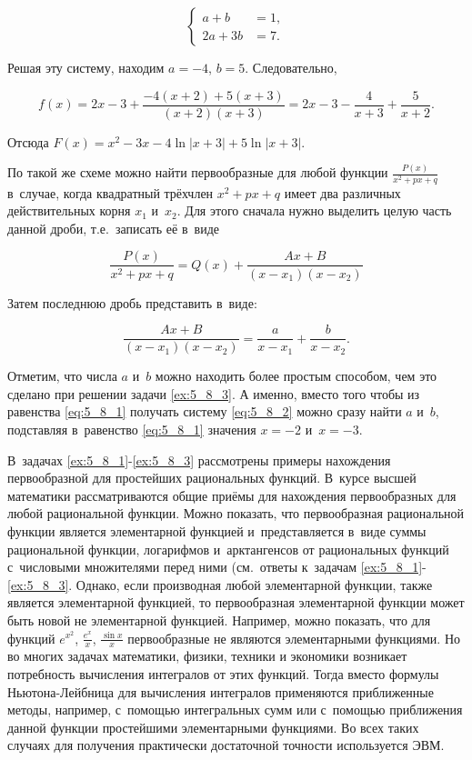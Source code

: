 \begin{equation}\label{eq:5_8_2}
\begin{cases}
a + b &= 1, \\
2a + 3b &= 7.
\end{cases}
\end{equation}

Решая эту систему, находим $a = -4$, $b = 5$.
Следовательно, 

\begin{equation*}
\displaystyle f(x) = 
2x - 3 + \frac{-4(x+2) + 5(x+3)}{(x+2)(x+3)} = 
2x - 3 - \frac{4}{x+3} + \frac{5}{x+2}.
\end{equation*}

Отсюда $F(x) = x^{2} - 3x - 4\ln |x+3| + 5\ln |x + 3|$.

По такой же схеме можно найти первообразные для любой функции 
$\displaystyle \frac{P(x)}{x^{2} + px + q}$ 
в~случае, когда квадратный трёхчлен $x^{2} + px + q$ имеет два различных
действительных корня $x_{1}$ и~$x_{2}$.
Для этого сначала нужно выделить целую часть данной дроби,
т.е.\ записать её в~виде

\begin{equation*}
\displaystyle \frac{P(x)}{x^{2} + px + q} = Q(x) + \frac{Ax + B}{(x-x_{1})(x-x_{2})}
\end{equation*}

\noindent
Затем последнюю дробь представить в~виде:

\begin{equation*}
\displaystyle \frac{Ax + B}{(x-x_{1})(x-x_{2})} = \frac{a}{x - x_{1}} + \frac{b}{x - x_{2}}.
\end{equation*}

Отметим, что числа $a$ и~$b$ можно находить более простым способом,
чем это сделано при решении задачи \ref{ex:5_8_3}. 
А именно, вместо того чтобы из равенства \eqref{eq:5_8_1} получать систему \eqref{eq:5_8_2}
можно сразу найти $a$ и~$b$, подставляя в~равенство \eqref{eq:5_8_1} значения
$x = -2$ и~$x = -3$.

В~задачах \ref{ex:5_8_1}-\ref{ex:5_8_3} рассмотрены примеры нахождения первообразной
для простейших рациональных функций. В~курсе высшей математики рассматриваются
общие приёмы для нахождения первообразных для любой рациональной функции.
Можно показать, что первообразная рациональной функции является элементарной функцией
и~представляется в~виде суммы рациональной функции, логарифмов и~арктангенсов
от рациональных функций с~числовыми множителями перед ними
(см.\ ответы к~задачам \ref{ex:5_8_1}-\ref{ex:5_8_3}.
Однако, если производная любой элементарной функции, также является элементарной функцией,
то первообразная элементарной функции может быть новой не элементарной функцией.
Например, можно показать, что для функций
$e^{x^{2}}$, $\displaystyle \frac{e^{x}}{x}$, $\displaystyle \frac{\sin x}{x}$
первообразные не являются элементарными функциями.
Но во многих задачах математики, физики, техники и экономики возникает потребность
вычисления интегралов от этих функций. Тогда вместо формулы Ньютона-Лейбница
для вычисления интегралов применяются приближенные методы, например,
с~помощью интегральных сумм или с~помощью приближения данной функции простейшими
элементарными функциями. Во всех таких случаях для получения практически достаточной
точности используется ЭВМ.
